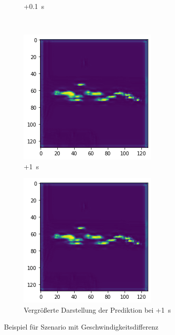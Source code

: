 \documentclass[12pt]{article}
\begin{document}
\begin{figure}[H]
\begin{subfigure}[b]{0.18\textwidth}
            \caption{+0.1~s}
        \end{subfigure}
        ~
        \begin{subfigure}[b]{0.18\textwidth}
            \includegraphics[width=\textwidth]{output_static_brake_4.png}
            \caption{+1~s}
        \end{subfigure}
        \vspace{1cm}
        \begin{subfigure}[b]{0.6\textwidth}
            \includegraphics[width=\textwidth]{output_static_brake_4.png}
            \caption{Vergrößerte Darstellung der Prediktion bei +1~s}
        \end{subfigure}
        \caption{Beispiel für Szenario mit Geschwindigkeitsdifferenz}\label{fig:out_static_brake}
    \end{figure}
\end{document}
